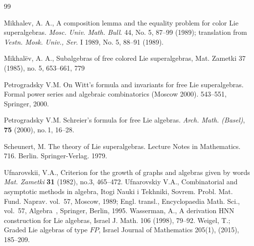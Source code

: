 \documentclass[12pt, reqno]{amsart}
\theoremstyle{remark}
\theoremstyle{definition}
\numberwithin{equation}{section}
\begin{document}
\begin{thebibliography}{99}

Mikhalev, A. A., A composition lemma and the equality problem for color Lie superalgebras. 
{\it Mosc. Univ. Math. Bull}. 44, No. 5, 87--99 (1989); translation from {\it Vestn. Mosk. Univ., Ser}. I 1989, No. 5,
88--91 (1989).

 Mikhal\"ev, A. A.,
  Subalgebras of free colored Lie superalgebras,
  Mat. Zametki 37 (1985), no. 5, 653–661, 779

  Petrogradsky V.M.
  On Witt's formula and invariants for free Lie superalgebras.
  Formal power series and algebraic combinatorics (Moscow 2000).
  543--551, Springer, 2000.


  Petrogradsky V.M.
  Schreier's formula for free Lie algebras.
  {\it Arch. Math. (Basel)}, {\bf 75} (2000), no.\,1, 16--28.

   Scheunert, M.
   The theory of Lie superalgebras.
   Lecture Notes in Mathematics. 716. Berlin. Springer-Verlag. 1979.


Ufnarovskii, V.A.,
Criterion for the growth of graphs and algebras given by words
{\it Mat. Zametki} {\bf 31} (1982), no.3, 465--472.
   Ufnarovskiy V.A.,
   {Combinatorial and asymptotic methods in algebra},
   Itogi Nauki i Tekhniki, Sovrem. Probl. Mat. Fund. Naprav.
   vol.~{57}, Moscow, 1989;
   Engl. transl.,
   Encyclopaedia Math. Sci., vol.~{57},
   \setcounter{r6}{6}  Algebra~,
   Springer, Berlin, 1995.
Wasserman, A.,  A derivation HNN construction for Lie algebras,
Israel J. Math. 106 (1998), 79--92.
 Weigel, T.; Graded Lie algebras of type $FP$,
Israel Journal of Mathematics 205(1), (2015), 185--209.

\end{thebibliography}
\end{document}
